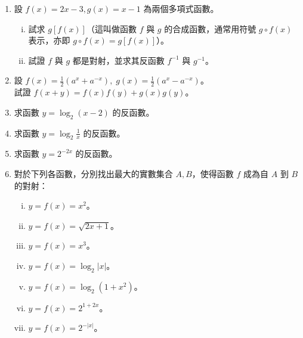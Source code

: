 \begin{enumerate}
    \item 設 $f(x) = 2x-3, g(x) = x-1$ 為兩個多項式函數。
    \begin{enumerate}[(i)]
        \item 試求 $g[f(x)]$（這叫做函數 $f$ 與 $g$ 的合成函數，通常用符號 $g\circ f(x)$ 表示，亦即 $g\circ f(x) = g[f(x)]$）。
        \item 試證 $f$ 與 $g$ 都是對射，並求其反函數 $f^{-1}$ 與 $g^{-1}$。
    \end{enumerate}
    \item 設 $f(x) = \frac{1}{2}(a^x + a^{-x}),\; g(x) = \frac{1}{2}(a^x - a^{-x})$。\\
    試證 $f(x+y) = f(x)f(y) + g(x)g(y)$。
    \item 求函數 $y = \log_2(x-2)$ 的反函數。
    \item 求函數 $y = \log_2 \frac{1}{x}$ 的反函數。
    \item 求函數 $y = 2^{-2x}$ 的反函數。
    \item 對於下列各函數，分別找出最大的實數集合 $A, B$，使得函數 $f$ 成為自 $A$ 到 $B$ 的對射：
    \begin{enumerate}[(i)]
        \item $y = f(x) = x^2$。
        \item $y = f(x) = \sqrt{2x+1}$。
        \item $y = f(x) = x^3$。
        \item $y = f(x) = \log_2 |x|$。
        \item $y = f(x) = \log_2(1+x^2)$。
        \item $y = f(x) = 2^{1+2x}$。
        \item $y = f(x) = 2^{-|x|}$。
    \end{enumerate}
\end{enumerate}
